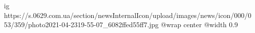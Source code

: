  
 
 
 
 

\ifcmt
  ig https://s.0629.com.ua/section/newsInternalIcon/upload/images/news/icon/000/053/359/photo2021-04-2319-55-07_6082ffed55ff7.jpg
  @wrap center
  @width 0.9
\fi
